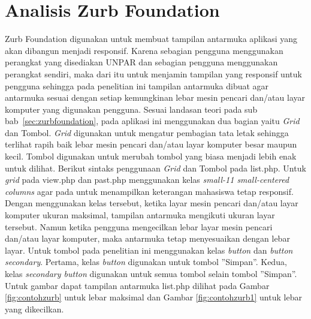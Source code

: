 \section{Analisis Zurb Foundation}
\label{sec:analisisZurbFoundation}
Zurb Foundation digunakan untuk membuat tampilan antarmuka aplikasi yang akan
dibangun menjadi responsif. Karena sebagian pengguna menggunakan perangkat yang disediakan UNPAR dan sebagian pengguna menggunakan perangkat sendiri, maka dari itu untuk menjamin tampilan yang responsif untuk pengguna sehingga pada penelitian ini tampilan antarmuka dibuat agar antarmuka sesuai dengan setiap kemungkinan lebar mesin pencari dan/atau layar komputer yang digunakan pengguna. Sesuai landasan teori pada sub bab~\ref{sec:zurbfoundation}, pada aplikasi ini menggunakan dua bagian yaitu {\it Grid} dan Tombol. {\it Grid} digunakan untuk mengatur pembagian tata letak sehingga terlihat rapih baik lebar mesin pencari dan/atau layar komputer besar maupun kecil. Tombol digunakan untuk merubah tombol yang biasa menjadi lebih enak untuk dilihat. Berikut sintaks penggunaan {\it Grid} dan Tombol pada list.php. Untuk {\it grid} pada view.php dan past.php menggunakan kelas {\it small-11 small-centered columns} agar pada untuk menampilkan keterangan mahasiswa tetap responsif. Dengan menggunakan kelas tersebut, ketika layar mesin pencari dan/atau layar komputer ukuran maksimal, tampilan antarmuka mengikuti ukuran layar tersebut. Namun ketika pengguna mengecilkan lebar layar mesin pencari dan/atau layar komputer, maka antarmuka tetap menyesuaikan dengan lebar layar. Untuk tombol pada penelitian ini menggunakan kelas {\it button} dan {\it button secondary}. Pertama, kelas {\it button} digunakan untuk tombol ''Simpan''. Kedua, kelas {\it secondary button} digunakan untuk semua tombol selain tombol ''Simpan''. Untuk gambar dapat tampilan antarmuka list.php dilihat pada Gambar \ref{fig:contohzurb} untuk lebar maksimal dan Gambar \ref{fig:contohzurb1} untuk lebar yang dikecilkan.

